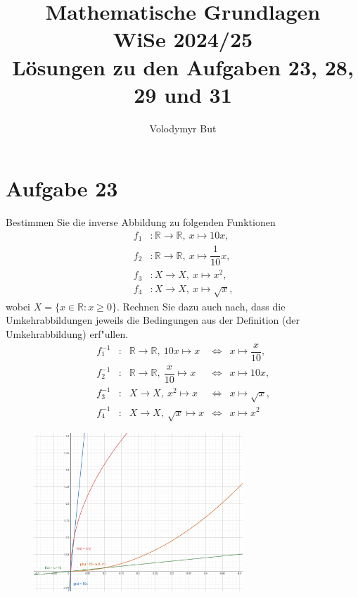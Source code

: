 \documentclass[10pt, oneside]{article}
\title{Mathematische Grundlagen\\[5pt]\Large WiSe 2024/25\\[10pt]\Large L{\"o}sungen zu den Aufgaben 23, 28, 29 und 31}
\author{Volodymyr But}
\date{}
\begin{document}
\sloppy

\maketitle
\vspace{25px}

\section{Aufgabe 23}

Bestimmen Sie die inverse Abbildung zu folgenden Funktionen
\begin{equation*}
    \begin{aligned}
        f_1 &: \mathbb{R} \rightarrow \mathbb{R},\ x \mapsto 10x \text{,} \\[5pt]
        f_2 &: \mathbb{R} \rightarrow \mathbb{R},\ x \mapsto \dfrac{1}{10}x \text{,} \\[5pt]
        f_3 &: X \rightarrow X,\ x \mapsto x^2 \text{,} \\[5pt]
        f_4 &: X \rightarrow X,\ x \mapsto \sqrt{x} \text{,}
    \end{aligned}
\end{equation*}
wobei $X = \{x \in \mathbb{R} : x \geq 0 \}$. Rechnen Sie dazu auch nach, dass
die Umkehrabbildungen jeweils die Bedingungen aus der Definition (der
Umkehrabbildung) erf"ullen.
\begin{equation*}
    \begin{array}{rcccl}
        f_1^{-1} &:& \mathbb{R} \rightarrow \mathbb{R},\ 10x \mapsto x &\iff& x \mapsto \dfrac{x}{10} \text{,} \\[10pt]
        f_2^{-1} &:& \mathbb{R} \rightarrow \mathbb{R},\ \dfrac{x}{10} \mapsto x &\iff& x \mapsto 10x \text{,} \\[10pt]
        f_3^{-1} &:& X \rightarrow X,\ x^2 \mapsto x &\iff& x \mapsto \sqrt{x} \text{,} \\[10pt]
        f_4^{-1} &:& X \rightarrow X,\ \sqrt{x} \mapsto x &\iff& x \mapsto x^2
    \end{array}
\end{equation*}
\begin{figure}[h]
    \centering
    \includegraphics[width=0.7\textwidth]{./assets/23-01.png}
\end{figure}
\end{document}
